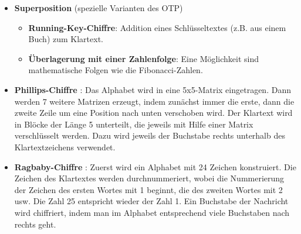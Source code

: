 \begin{refsegment}
\begin{itemize}
          Für diese Anforderung muss das Pad zufällig sein und es darf nur
          einmal benutzt werden (um jede Ähnlichkeit von Patterns aus dem
          Geheimtext zu eliminieren).\\
          Begründung: Gegeben sei Geheimtext C, Klartext P, Pad K, und zwei
          Klartexte, die jeweils mit dem gleichen Schlüssel verschlüsselt sind:
          C1 = P1 $\oplus$ K;  C2 = P2 $\oplus$ K; \\
          Damit ergibt sich C1 $\oplus$ C2 = (P1 $\oplus$ K) $\oplus$
                           (P2 $\oplus$ K) = P1 $\oplus$ P2. \\
          Diese Kombination kann die Klartexte \glqq durchsickern\grqq~lassen.\footnote{%
            In JCT kann man über den Menüeintrag
            \textbf{Visualisierungen \textbackslash{} Viterbi} mit der automatischen
            Kryptoanalyse von Running-Key-Geheimtexten unter Verwendung der
            Viterbi-Analyse spielen. Und sehen wie erstaunlich es ist, wenn sich aus
	    den geXOR-ten Chiffraten oder den geXOR-ten Klartexten nach und nach beide
	    ursprünglichen Klartexte gewinnen lassen.
          }


\item \textbf{Superposition} (spezielle Varianten des OTP)
   \begin{itemize}
      \item \textbf{Running-Key-Chiffre}:
         Addition eines Schlüsseltextes (z.B. aus einem Buch) zum Klartext.

      \item \textbf{Überlagerung mit einer Zahlenfolge}:
         Eine Möglichkeit sind mathematische Folgen wie die Fibonacci-Zahlen.
   \end{itemize}


\item \textbf{Phillips-Chiffre} \cite{ACA2002}:
   Das Alphabet wird in eine 5x5-Matrix eingetragen. Dann werden 7 weitere
   Matrizen erzeugt, indem zunächst immer die erste, dann die zweite Zeile
   um eine Position nach unten verschoben wird. Der Klartext wird in Blöcke
   der Länge 5 unterteilt, die jeweils mit Hilfe einer Matrix verschlüsselt
   werden. Dazu wird jeweils der Buchstabe rechts unterhalb des
   Klartextzeichens verwendet.


\item \textbf{Ragbaby-Chiffre} \cite{ACA2002}:
   Zuerst wird ein Alphabet mit 24 Zeichen konstruiert. Die Zeichen des
   Klartextes werden durchnummeriert, wobei die Nummerierung der Zeichen des
   ersten Wortes mit 1 beginnt, die des zweiten Wortes mit 2 usw. Die Zahl 25
   entspricht wieder der Zahl 1. Ein Buchstabe der Nachricht wird chiffriert,
   indem man im Alphabet entsprechend viele Buchstaben nach rechts geht.


\end{itemize}
\end{refsegment}
